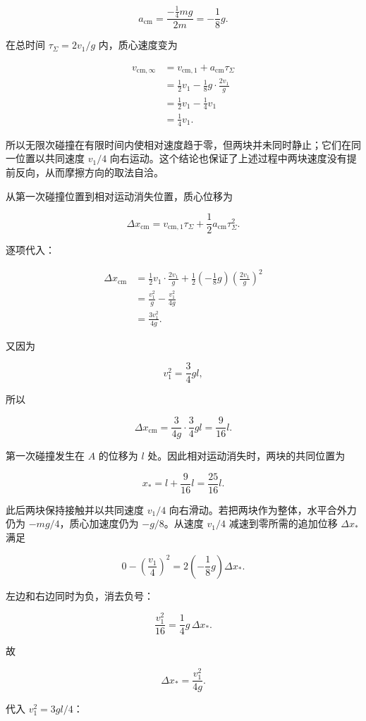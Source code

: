 \documentclass[12pt,a4paper,UTF8]{ctexart}
\begin{document}
\[a_{\mathrm{cm}}
=\frac{-\frac14mg}{2m}
=-\frac18g.\]

在总时间 \(\tau_\Sigma=2v_1/g\) 内，质心速度变为

\[\begin{aligned}
v_{\mathrm{cm},\infty}
&=v_{\mathrm{cm},1}+a_{\mathrm{cm}}\tau_\Sigma\\
&=\frac12v_1-\frac18g\cdot\frac{2v_1}{g}\\
&=\frac12v_1-\frac14v_1\\
&=\frac14v_1.
\end{aligned}\]

所以无限次碰撞在有限时间内使相对速度趋于零，但两块并未同时静止；它们在同一位置以共同速度
\(v_1/4\)
向右运动。这个结论也保证了上述过程中两块速度没有提前反向，从而摩擦方向的取法自洽。

从第一次碰撞位置到相对运动消失位置，质心位移为

\[\Delta x_{\mathrm{cm}}
=v_{\mathrm{cm},1}\tau_\Sigma
+\frac12a_{\mathrm{cm}}\tau_\Sigma^2.\]

逐项代入：

\[\begin{aligned}
\Delta x_{\mathrm{cm}}
&=\frac12v_1\cdot\frac{2v_1}{g}
+\frac12\left(-\frac18g\right)
\left(\frac{2v_1}{g}\right)^2\\
&=\frac{v_1^2}{g}
-\frac{v_1^2}{4g}\\
&=\frac{3v_1^2}{4g}.
\end{aligned}\]

又因为

\[v_1^2=\frac34gl,\]

所以

\[\Delta x_{\mathrm{cm}}
=\frac{3}{4g}\cdot\frac34gl
=\frac9{16}l.\]

第一次碰撞发生在 \(A\) 的位移为 \(l\)
处。因此相对运动消失时，两块的共同位置为

\[x_*=
l+\frac9{16}l
=\frac{25}{16}l.\]

此后两块保持接触并以共同速度 \(v_1/4\)
向右滑动。若把两块作为整体，水平合外力仍为 \(-mg/4\)，质心加速度仍为
\(-g/8\)。从速度 \(v_1/4\) 减速到零所需的追加位移 \(\Delta x_*\) 满足

\[0-\left(\frac{v_1}{4}\right)^2
=2\left(-\frac18g\right)\Delta x_*.\]

左边和右边同时为负，消去负号：

\[\frac{v_1^2}{16}=\frac14g\,\Delta x_*.\]

故

\[\Delta x_*=\frac{v_1^2}{4g}.\]

代入 \(v_1^2=3gl/4\)：
\end{document}
